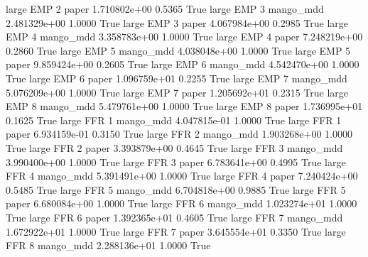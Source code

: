      large      EMP                 2                 paper 1.710802e+00      0.5365    True
     large      EMP                 3             mango_mdd 2.481329e+00      1.0000    True
     large      EMP                 3                 paper 4.067984e+00      0.2985    True
     large      EMP                 4             mango_mdd 3.358783e+00      1.0000    True
     large      EMP                 4                 paper 7.248219e+00      0.2860    True
     large      EMP                 5             mango_mdd 4.038048e+00      1.0000    True
     large      EMP                 5                 paper 9.859424e+00      0.2605    True
     large      EMP                 6             mango_mdd 4.542470e+00      1.0000    True
     large      EMP                 6                 paper 1.096759e+01      0.2255    True
     large      EMP                 7             mango_mdd 5.076209e+00      1.0000    True
     large      EMP                 7                 paper 1.205692e+01      0.2315    True
     large      EMP                 8             mango_mdd 5.479761e+00      1.0000    True
     large      EMP                 8                 paper 1.736995e+01      0.1625    True
     large      FFR                 1             mango_mdd 4.047815e-01      1.0000    True
     large      FFR                 1                 paper 6.934159e-01      0.3150    True
     large      FFR                 2             mango_mdd 1.903268e+00      1.0000    True
     large      FFR                 2                 paper 3.393879e+00      0.4645    True
     large      FFR                 3             mango_mdd 3.990400e+00      1.0000    True
     large      FFR                 3                 paper 6.783641e+00      0.4995    True
     large      FFR                 4             mango_mdd 5.391491e+00      1.0000    True
     large      FFR                 4                 paper 7.240424e+00      0.5485    True
     large      FFR                 5             mango_mdd 6.704818e+00      0.9885    True
     large      FFR                 5                 paper 6.680084e+00      1.0000    True
     large      FFR                 6             mango_mdd 1.023274e+01      1.0000    True
     large      FFR                 6                 paper 1.392365e+01      0.4605    True
     large      FFR                 7             mango_mdd 1.672922e+01      1.0000    True
     large      FFR                 7                 paper 3.645554e+01      0.3350    True
     large      FFR                 8             mango_mdd 2.288136e+01      1.0000    True
